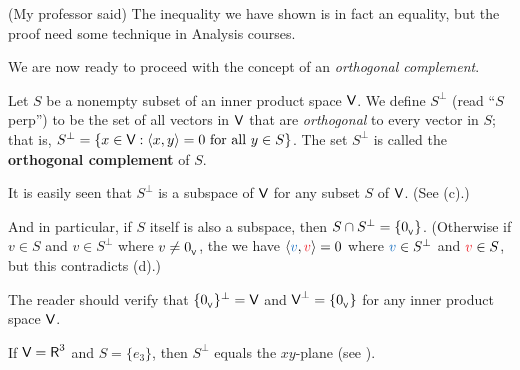 \begin{note}
(My professor said) The inequality we have shown is in fact an equality, but the proof need some technique in Analysis courses.
\end{note}

We are now ready to proceed with the concept of an \emph{orthogonal complement}.

\begin{definition} \label{def 6.7}
Let \(S\) be a nonempty subset of an inner product space \(\textsf{V}\).
We define \(S^{\perp}\) (read ``\(S\) perp'') to be the set of all vectors in \(\textsf{V}\) that are \emph{orthogonal} to every vector in \(S\);
that is, \(S^{\perp} = \{ x \in \textsf{V}: \left< x, y \right> = 0 \text{ for all } y \in S\}\).
The set \(S^{\perp}\) is called the \textbf{orthogonal complement} of \(S\).

It is easily seen that \(S^{\perp}\) is a subspace of \(\textsf{V}\) for any subset \(S\) of \(\textsf{V}\). (See (c).)

And in particular, if \(S\) itself is also a subspace, then \(S \cap S^{\perp} = \{ 0_{_{\textsf{V}}} \}\).
(Otherwise if \(v \in S\) and \(v \in S^{\perp}\) where \(v \ne 0_{_{\textsf{V}}}\), the we have \(\LG \BLUE{v}, \RED{v} \RG = 0\) where \(\BLUE{v} \in S^{\perp}\) and \(\RED{v} \in S\), but this contradicts (d).)
\end{definition}

\begin{example} \label{example 6.2.8}
The reader should verify that \(\{ 0_{_{\textsf{V}}} \}^{\perp} = \textsf{V}\) and \(\textsf{V}^{\perp} = \{ 0_{_{\textsf{V}}} \}\) for any inner product space \(\textsf{V}\).
\end{example}

\begin{example} \label{example 6.2.9}
If \(\textsf{V} = \textsf{R}^3\) and \(S = \{ e_3 \}\), then \(S^{\perp}\) equals the \(xy\)-plane (see ).
\end{example}

